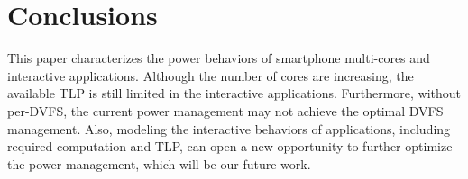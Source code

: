 \vspace{-0.2in}
\section{Conclusions}
\vspace{-0.2in}
This paper characterizes the power behaviors of smartphone multi-cores and interactive applications. 
Although the number of cores are increasing, the available TLP is still limited in the interactive
applications. Furthermore, without per-DVFS, the current power management may not achieve the optimal
DVFS management. Also, modeling the interactive behaviors of applications, including required computation and
TLP, can open a new opportunity to further optimize the power management, which will be our future work.

